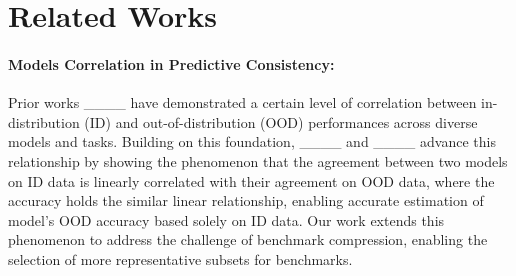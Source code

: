 \section{Related Works}
\label{apd:related_works}
\paragraph{Models Correlation in Predictive Consistency:} Prior works ____ have demonstrated a certain level of correlation between in-distribution (ID) and out-of-distribution (OOD) performances across diverse models and tasks. Building on this foundation, ____ and ____ advance this relationship by showing the phenomenon that the agreement between two models on ID data is linearly correlated with their agreement on OOD data, where the accuracy holds the similar linear relationship, enabling accurate estimation of model's OOD accuracy based solely on ID data. Our work extends this phenomenon to address the challenge of benchmark compression, enabling the selection of more representative subsets for benchmarks. 

